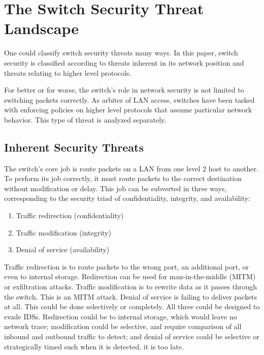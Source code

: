 \documentclass[journal]{IEEEtran}
\begin{document}
\section{The Switch Security Threat Landscape}

One could classify switch security threats many ways. In this paper, switch security is classified
according to threats inherent in its network position and threats relating to higher level
protocols.

For better or for worse, the switch's role in network security is not limited to switching packets
correctly. As arbiter of LAN access, switches have been tasked with enforcing policies on higher
level protocols that assume particular network behavior. This type of threat is analyzed separately.

\subsection{Inherent Security Threats}
The switch's core job is route packets on a LAN from one level 2 host to another. To perform its
job correctly, it must route packets to the correct destination without modification or delay. This
job can be subverted in three ways, corresponding to the security triad of confidentiality,
integrity, and availability:

\begin{enumerate}
  \item Traffic redirection (confidentiality) %
  \item Traffic modification (integrity)
  \item Denial of service (availability)
\end{enumerate}

Traffic redirection is to route packets to the wrong port, an additional port, or even to internal
storage. Redirection can be used for man-in-the-middle (MITM) or exfiltration attacks. Traffic
modification is to rewrite data as it passes through the switch. This is an MITM attack. Denial of
service is failing to deliver packets at all. This could be done selectively or completely. All
three could be designed to evade IDSs. Redirection could be to internal storage, which would leave
no network trace; modification could be selective, and require comparison of all inbound and
outbound traffic to detect; and denial of service could be selective or strategically timed such
when it is detected, it is too late.
\end{document}
